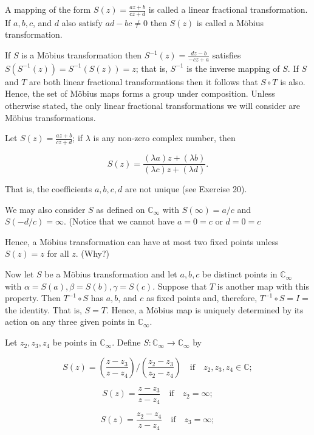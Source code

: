 A mapping of the form $S(z) = \frac{az+b}{cz+d}$ is called a linear fractional transformation. If $a, b, c$, and $d$ also satisfy $ad-bc \neq 0$ then $S(z)$ is called a Möbius transformation.

If $S$ is a Möbius transformation then $S^{-1}(z) = \frac{dz-b}{-cz+a}$ satisfies $S(S^{-1}(z)) = S^{-1}(S(z)) = z$; that is, $S^{-1}$ is the inverse mapping of $S$. If $S$ and $T$ are both linear fractional transformations then it follows that $S \circ T$ is also. Hence, the set of Möbius maps forms a group under composition. Unless otherwise stated, the only linear fractional transformations we will consider are Möbius transformations.

Let $S(z) = \frac{az+b}{cz+d}$; if $\lambda$ is any non-zero complex number, then

$$S(z) = \frac{(\lambda a)z + (\lambda b)}{(\lambda c)z + (\lambda d)}.$$

That is, the coefficients $a, b, c, d$ are not unique (see Exercise 20).

We may also consider $S$ as defined on $\mathbb{C}_\infty$ with $S(\infty) = a/c$ and $S(-d/c) = \infty$. (Notice that we cannot have $a = 0 = c$ or $d = 0 = c$

Hence, a Möbius transformation can have at most two fixed points unless $S(z) = z$ for all $z$. (Why?)

Now let $S$ be a Möbius transformation and let $a, b, c$ be distinct points in $\mathbb{C}_{\infty}$ with $\alpha = S(a), \beta = S(b), \gamma = S(c)$. Suppose that $T$ is another map with this property. Then $T^{-1} \circ S$ has $a, b$, and $c$ as fixed points and, therefore, $T^{-1} \circ S = I =$ the identity. That is, $S = T$. Hence, a Möbius map is uniquely determined by its action on any three given points in $\mathbb{C}_{\infty}$.

Let $z_2, z_3, z_4$ be points in $\mathbb{C}_{\infty}$. Define $S: \mathbb{C}_{\infty} \rightarrow \mathbb{C}_{\infty}$ by

$$S(z) = \left( \frac{z - z_3}{z - z_4} \right) / \left( \frac{z_2 - z_3}{z_2 - z_4} \right) \quad \text{if} \quad z_2, z_3, z_4 \in \mathbb{C};$$

$$S(z) = \frac{z - z_3}{z - z_4} \quad \text{if} \quad z_2 = \infty;$$

$$S(z) = \frac{z_2 - z_4}{z - z_4} \quad \text{if} \quad z_3 = \infty;$$